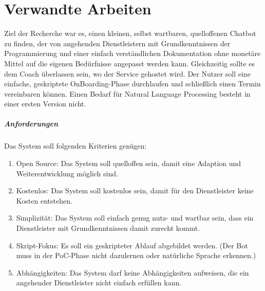 \label{Verwandte Arbeiten}
\chapter{Verwandte Arbeiten}

    Ziel der Recherche war es, einen kleinen, selbst wartbaren, quelloffenen Chatbot zu finden, der von angehenden Dienstleistern mit Grundkenntnissen der Programmierung und einer einfach verständlichen Dokumentation ohne monetäre Mittel auf die eigenen Bedürfnisse angepasst werden kann. Gleichzeitig sollte es dem Coach überlassen sein, wo der Service gehostet wird. Der Nutzer soll eine einfache, geskriptete OnBoarding-Phase durchlaufen und schließlich einen Termin vereinbaren können. Einen Bedarf für Natural Language Processing besteht in einer ersten Version nicht. 

    \paragraph{Anforderungen}
    Das System soll folgenden Kriterien genügen:
    \begin{enumerate}
        \item Open Source: Das System soll quelloffen sein, damit eine Adaption und Weiterentwicklung möglich sind.
        \item Kostenlos: Das System soll kostenlos sein, damit für den Dienstleister keine Kosten entstehen.
        \item Simplizität: Das System soll einfach genug nutz- und wartbar sein, dass ein Dienstleister mit Grundkenntnissen damit zurecht kommt.
        \item Skript-Fokus: Es soll ein geskripteter Ablauf abgebildet werden. (Der Bot muss in der PoC-Phase nicht dazulernen oder natürliche Sprache erkennen.) 
        \item Abhängigkeiten: Das System darf keine Abhängigkeiten aufweisen, die ein angehender Dienstleister nicht einfach erfüllen kann.
    \end{enumerate}

